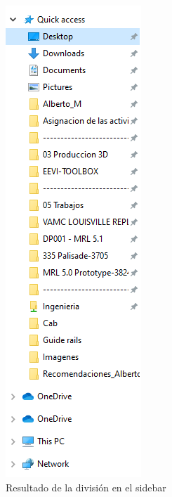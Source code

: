 \documentclass[12pt,letterpaper,final]{report}
\begin{document}
\begin{figure}[H]
	\centering
	\includegraphics[width=0.75\linewidth, height=0.75\textheight,keepaspectratio]{Imagenes/fe_division_03}
	\caption{Resultado de la división en el sidebar}
	\label{fig:fedivision03}
\end{figure}
\end{document}
